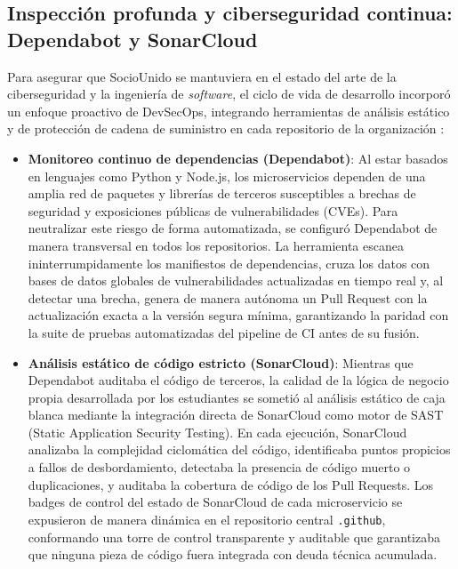 \documentclass[conference, a4paper]{IEEEtran}
\begin{document}
\subsection{Inspecci\'on profunda y ciberseguridad continua: Dependabot y SonarCloud}
Para asegurar que SocioUnido se mantuviera en el estado del arte de la ciberseguridad y la ingenier\'ia de \textit{software}, el ciclo de vida de desarrollo incorpor\'o un enfoque proactivo de DevSecOps, integrando herramientas de an\'alisis est\'atico y de protecci\'on de cadena de suministro en cada repositorio de la organizaci\'on :

\begin{itemize}
    \item \textbf{Monitoreo continuo de dependencias (Dependabot)}: Al estar basados en lenguajes como Python y Node.js, los microservicios dependen de una amplia red de paquetes y librer\'ias de terceros susceptibles a brechas de seguridad y exposiciones p\'ublicas de vulnerabilidades (CVEs). Para neutralizar este riesgo de forma automatizada, se configur\'o Dependabot de manera transversal en todos los repositorios. La herramienta escanea ininterrumpidamente los manifiestos de dependencias, cruza los datos con bases de datos globales de vulnerabilidades actualizadas en tiempo real y, al detectar una brecha, genera de manera aut\'onoma un Pull Request con la actualizaci\'on exacta a la versi\'on segura m\'inima, garantizando la paridad con la suite de pruebas automatizadas del pipeline de CI antes de su fusi\'on.
    \item \textbf{An\'alisis est\'atico de c\'odigo estricto (SonarCloud)}: Mientras que Dependabot auditaba el c\'odigo de terceros, la calidad de la l\'ogica de negocio propia desarrollada por los estudiantes se someti\'o al an\'alisis est\'atico de caja blanca mediante la integraci\'on directa de SonarCloud como motor de SAST (Static Application Security Testing). En cada ejecuci\'on, SonarCloud analizaba la complejidad ciclom\'atica del c\'odigo, identificaba puntos propicios a fallos de desbordamiento, detectaba la presencia de c\'odigo muerto o duplicaciones, y auditaba la cobertura de c\'odigo de los Pull Requests. Los badges de control del estado de SonarCloud de cada microservicio se expusieron de manera din\'amica en el repositorio central \texttt{.github}, conformando una torre de control transparente y auditable que garantizaba que ninguna pieza de c\'odigo fuera integrada con deuda t\'ecnica acumulada.
\end{itemize}
\end{document}
